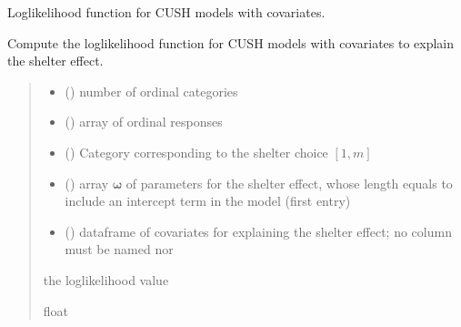 \documentclass[letterpaper,10pt,english]{sphinxmanual}
\begin{document}
\begin{fulllineitems}
\label{\detokenize{cubmods:cubmods.cush_x.loglik}}
\pysigstartsignatures
{}
\pysigstopsignatures
\sphinxAtStartPar
Log\sphinxhyphen{}likelihood function for CUSH models with covariates.

\sphinxAtStartPar
Compute the log\sphinxhyphen{}likelihood function for CUSH models with covariates 
to explain the shelter effect.
\begin{quote}\begin{description}
\begin{itemize}
\item {} 
\sphinxAtStartPar
{} () \textendash{} number of ordinal categories

\item {} 
\sphinxAtStartPar
{} () \textendash{} array of ordinal responses

\item {} 
\sphinxAtStartPar
{} () \textendash{} Category corresponding to the shelter choice \([1,m]\)

\item {} 
\sphinxAtStartPar
{} () \textendash{} array \(\pmb \omega\) of parameters for the shelter effect, whose length equals 
 to include an intercept term in the model (first entry)

\item {} 
\sphinxAtStartPar
{} () \textendash{} dataframe of covariates for explaining the shelter effect;
no column must be named  nor 

\end{itemize}

\sphinxAtStartPar
the log\sphinxhyphen{}likelihood value

\sphinxAtStartPar
float

\end{description}\end{quote}

\end{fulllineitems}
\end{document}
